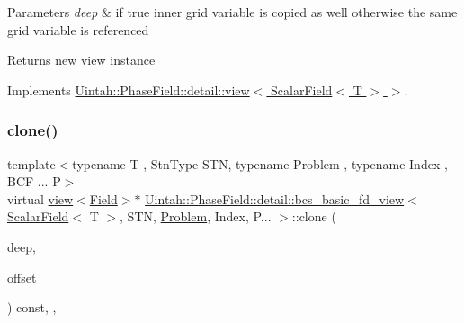 \begin{DoxyParams}{Parameters}
{\em deep} & if true inner grid variable is copied as well otherwise the same grid variable is referenced\\
\hline
\end{DoxyParams}
\begin{DoxyReturn}{Returns}
new view instance 
\end{DoxyReturn}


Implements \hyperlink{classUintah_1_1PhaseField_1_1detail_1_1view_3_01ScalarField_3_01T_01_4_01_4_a6e11243c9d776a7b703e524ea4151a16}{Uintah\+::\+Phase\+Field\+::detail\+::view$<$ Scalar\+Field$<$ T $>$ $>$}.

\mbox{\label{classUintah_1_1PhaseField_1_1detail_1_1bcs__basic__fd__view_3_01ScalarField_3_01T_01_4_00_01STN_07caa9955adf783da0505eac75e76f08_abc781c41321336b5cc9e47157d133b2e}} 
\subsubsection{\texorpdfstring{clone()}{clone()}\hspace{0.1cm}{\footnotesize\ttfamily [2/2]}}
{\footnotesize\ttfamily template$<$typename T , Stn\+Type S\+TN, typename Problem , typename Index , B\+C\+F ... P$>$ \\
virtual \hyperlink{classUintah_1_1PhaseField_1_1detail_1_1view}{view}$<$\hyperlink{structUintah_1_1PhaseField_1_1ScalarField}{Field}$>$$\ast$ \hyperlink{classUintah_1_1PhaseField_1_1detail_1_1bcs__basic__fd__view}{Uintah\+::\+Phase\+Field\+::detail\+::bcs\+\_\+basic\+\_\+fd\+\_\+view}$<$ \hyperlink{structUintah_1_1PhaseField_1_1ScalarField}{Scalar\+Field}$<$ T $>$, S\+TN, \hyperlink{classUintah_1_1PhaseField_1_1Problem}{Problem}, Index, P... $>$\+::clone (\begin{DoxyParamCaption}\item[{bool}]{deep,  }\item[{const Int\+Vector \&}]{offset }\end{DoxyParamCaption}) const\hspace{0.3cm}{\ttfamily [inline]}, {\ttfamily [override]}, {\ttfamily [virtual]}}



